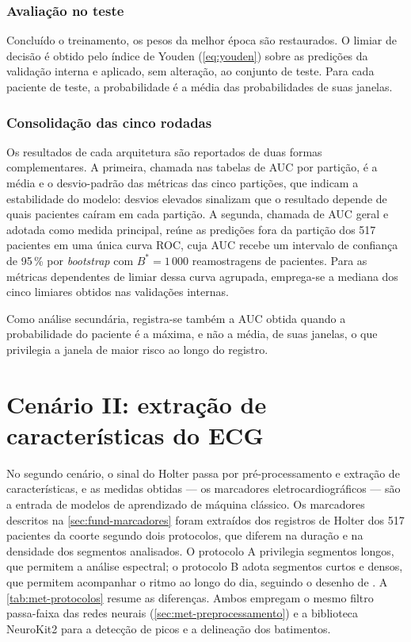 \subsubsection{Avaliação no teste}

Concluído o treinamento, os pesos da melhor época são restaurados. O limiar
de decisão é obtido pelo índice de Youden (\autoref{eq:youden}) sobre as
predições da validação interna e aplicado, sem alteração, ao conjunto de
teste. Para cada paciente de teste, a probabilidade é a média das
probabilidades de suas janelas.

\subsubsection{Consolidação das cinco rodadas}

Os resultados de cada arquitetura são reportados de duas formas
complementares. A primeira, chamada nas tabelas de \gls{AUC} por
partição, é a média e o desvio-padrão das métricas das cinco partições, que indicam a estabilidade do modelo: desvios elevados
sinalizam que o resultado depende de quais pacientes caíram em cada
partição. A segunda, chamada de \gls{AUC} geral e adotada como medida
principal, reúne as predições fora da partição dos 517 pacientes em
uma única curva ROC, cuja \gls{AUC} recebe um intervalo de confiança de
95\,\% por \textit{bootstrap} com $B^{*} = 1\,000$ reamostragens de
pacientes. Para as métricas dependentes de limiar dessa curva agrupada,
emprega-se a mediana dos cinco limiares obtidos nas validações internas.

Como análise secundária, registra-se também a \gls{AUC} obtida quando a
probabilidade do paciente é a máxima, e não a média, de suas janelas, o que
privilegia a janela de maior risco ao longo do registro.



\section{Cenário II: extração de características do ECG}
\label{sec:met-cenario2}
\label{sec:met-extracao}

No segundo cenário, o sinal do Holter passa por pré-processamento e extração
de características, e as medidas obtidas --- os marcadores
eletrocardiográficos --- são a entrada de modelos de aprendizado de máquina
clássico. Os marcadores descritos na \autoref{sec:fund-marcadores} foram extraídos dos
registros de Holter dos 517 pacientes da coorte segundo dois protocolos,
que diferem na duração e na densidade dos segmentos analisados. O protocolo
A privilegia segmentos longos, que permitem a análise espectral; o protocolo
B adota segmentos curtos e densos, que permitem acompanhar o ritmo ao longo
do dia, seguindo o desenho de . A
\autoref{tab:met-protocolos} resume as diferenças. Ambos empregam o mesmo
filtro passa-faixa das redes neurais (\autoref{sec:met-preprocessamento}) e
a biblioteca NeuroKit2 \cite{makowski2021neurokit2} para a detecção de picos
e a delineação dos batimentos.


